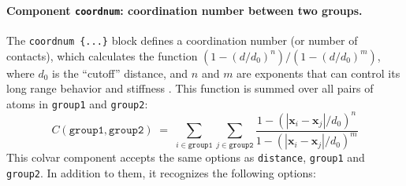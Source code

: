 \paragraph*{Component \texttt{coordnum}: coordination number
  between two groups.}  The \texttt{coordnum \{...\}} block defines
a coordination number (or number of contacts), which calculates the
function $(1-(d/d_0)^{n})/(1-(d/d_0)^{m})$, where $d_0$ is the
``cutoff'' distance, and $n$ and $m$ are exponents that can control
its long range behavior and stiffness \cite{Iannuzzi2003}.  This
function is summed over all pairs of atoms in \texttt{group1} and
\texttt{group2}:
\begin{equation}
  \label{eq:cvc_coordnum}
  C (\mathtt{group1}, \mathtt{group2}) \; = \; 
  \sum_{i\in\mathtt{group1}}\sum_{j\in\mathtt{group2}} {
    \frac{1 - (|\mathbf{x}_{i}-\mathbf{x}_{j}|/d_{0})^{n}}{
      1 - (|\mathbf{x}_{i}-\mathbf{x}_{j}|/d_{0})^{m} }
  }
\end{equation}
This colvar component accepts the same options as \texttt{distance},
\texttt{group1} and \texttt{group2}.  In addition to them, it
recognizes the following options:

